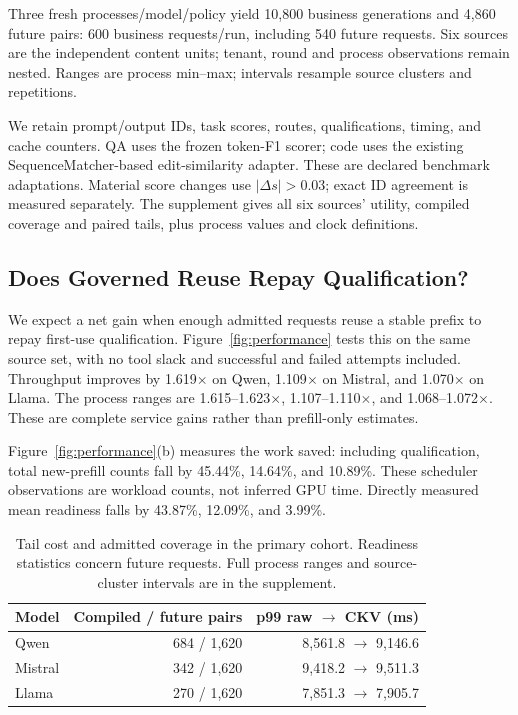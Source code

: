 Three fresh processes/model/policy yield 10,800 business generations and 4,860 future pairs: 600 business requests/run, including 540 future requests. Six sources are the independent content units; tenant, round and process observations remain nested. Ranges are process min--max; intervals resample source clusters and repetitions.

We retain prompt/output IDs, task scores, routes, qualifications, timing, and cache counters. QA uses the frozen token-F1 scorer; code uses the existing SequenceMatcher-based edit-similarity adapter. These are declared benchmark adaptations. Material score changes use $|\Delta s|>0.03$; exact ID agreement is measured separately. The supplement gives all six sources' utility, compiled coverage and paired tails, plus process values and clock definitions.

\subsection{Does Governed Reuse Repay Qualification?}
\label{sec:mainresults}
We expect a net gain when enough admitted requests reuse a stable prefix to repay first-use qualification. Figure~\ref{fig:performance} tests this on the same source set, with no tool slack and successful and failed attempts included. Throughput improves by 1.619$\times$ on Qwen, 1.109$\times$ on Mistral, and 1.070$\times$ on Llama. The process ranges are 1.615--1.623$\times$, 1.107--1.110$\times$, and 1.068--1.072$\times$. These are complete service gains rather than prefill-only estimates.

Figure~\ref{fig:performance}(b) measures the work saved: including qualification, total new-prefill counts fall by 45.44\%, 14.64\%, and 10.89\%. These scheduler observations are workload counts, not inferred GPU time. Directly measured mean readiness falls by 43.87\%, 12.09\%, and 3.99\%.

\begin{table}[t]
\centering\small
\caption{Tail cost and admitted coverage in the primary cohort. Readiness statistics concern future requests. Full process ranges and source-cluster intervals are in the supplement.}
\label{tab:primary}
\begin{tabular}{@{}lrr@{}}
\toprule
Model & Compiled / future pairs & p99 raw $\rightarrow$ CKV (ms)\\
\midrule
Qwen & 684 / 1,620 & 8,561.8 $\rightarrow$ 9,146.6\\
Mistral & 342 / 1,620 & 9,418.2 $\rightarrow$ 9,511.3\\
Llama & 270 / 1,620 & 7,851.3 $\rightarrow$ 7,905.7\\
\bottomrule
\end{tabular}
\end{table}

